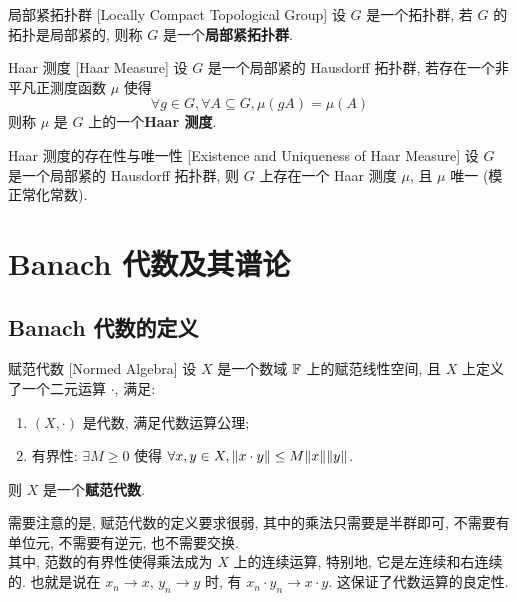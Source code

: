         \begin{dfn}
            {局部紧拓扑群}
            [Locally Compact Topological Group]
            设 \(G\) 是一个拓扑群, 若 \(G\) 的拓扑是局部紧的, 则称 \(G\) 是一个\textbf{局部紧拓扑群}.
        \end{dfn}

        \begin{dfn}
            {Haar 测度}
            [Haar Measure]
            设 \(G\) 是一个局部紧的 Hausdorff 拓扑群, 若存在一个非平凡正测度函数 \(\mu\) 使得
            \[\forall g\in G, \forall A\subseteq G, \mu(gA)=\mu(A)\]
            则称 \(\mu\) 是 \(G\) 上的一个\textbf{Haar 测度}.
        \end{dfn}

        \begin{thm}
            {Haar 测度的存在性与唯一性}
            [Existence and Uniqueness of Haar Measure]
            设 \(G\) 是一个局部紧的 Hausdorff 拓扑群, 则 \(G\) 上存在一个 Haar 测度 \(\mu\), 且 \(\mu\) 唯一 (模正常化常数).
        \end{thm}

\section{Banach 代数及其谱论}

    \subsection{Banach 代数的定义}

        \begin{dfn}
            {赋范代数}
            [Normed Algebra]
            设 \(X\) 是一个数域 \(\operatorname{\mathbb{F}}\) 上的赋范线性空间, 且 \(X\) 上定义了一个二元运算 \(\cdot\), 满足:
            \begin{enumerate}[label=(\roman*)]
                \item \((X, \cdot)\) 是代数, 满足代数运算公理;
                \item 有界性: \(\exists M\geq 0\) 使得 \(\forall x,y\in X, \norm{x\cdot y}\leq M\norm{x}\norm{y}\).
            \end{enumerate}
            则 \(X\) 是一个\textbf{赋范代数}.
        \end{dfn}

        \begin{rmk}
            [Dedicatia]
            需要注意的是, 赋范代数的定义要求很弱, 其中的乘法只需要是半群即可, 不需要有单位元, 不需要有逆元, 也不需要交换. \\
            其中, 范数的有界性使得乘法成为 \(X\) 上的连续运算, 特别地, 它是左连续和右连续的. 也就是说在 \(x_n\to x\), \(y_n\to y\) 时, 有 \(x_n\cdot y_n\to x\cdot y\). 这保证了代数运算的良定性.
        \end{rmk}

